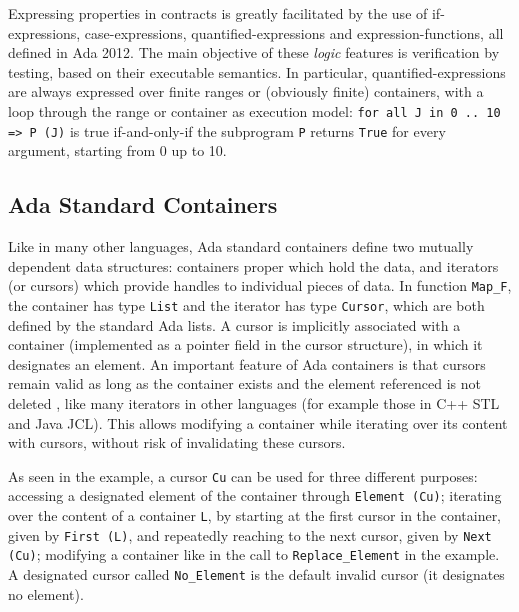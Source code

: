 \documentclass[runningheads,a4paper]{llncs}
\newcommand{\beforesub}{\vspace{-0.2cm}}
\newcommand{\aftersub}{\vspace{-0.1cm}}
\begin{document}
Expressing properties in contracts is greatly facilitated by the use of
if-expressions, case-expressions, quantified-expressions and expression-functions, 
all defined in Ada 2012. The main objective of these \emph{logic} features is
verification by testing, based on their executable semantics.
In particular, quantified-expressions are always
expressed over finite ranges or (obviously finite) containers, with a loop
through the range or container as execution model:
\verb|for all J in 0 .. 10 => P (J)| is true if-and-only-if the subprogram
\verb|P| returns \verb|True| for every argument, starting from 0 up to 10.

\beforesub
\subsection{Ada Standard Containers}
\aftersub

Like in many other languages, Ada standard containers define two mutually
dependent data structures: containers proper which hold the data, and iterators
(or cursors) which provide handles to individual pieces of data. In function
\verb|Map_F|, the container has type \verb|List| and the iterator has type
\verb|Cursor|, which are both defined by the standard Ada lists. A cursor is
implicitly associated with a container (implemented as a pointer field in the
cursor structure), in which it designates an element. An important feature of Ada
containers is that cursors remain valid as long as the container
exists and the element referenced is not deleted
, like
many iterators in other languages (for example those in C++ STL and Java JCL).
This allows modifying a container while iterating over its content with
cursors, without risk of invalidating these cursors.

\ifdefined\longversion
As seen in the example, a cursor \verb|Cu| can be used for three different purposes:
accessing a designated element of the container through \verb|Element (Cu)|;
iterating over the content of a container \verb|L|,
by starting at the first cursor in the container, given by \verb|First (L)|,
and repeatedly reaching to the next cursor, given by \verb|Next (Cu)|;
modifying a container like in the call to \verb|Replace_Element| in the example.
A designated cursor called \verb|No_Element| is the default invalid cursor (it
designates no element).
\fi
\end{document}
